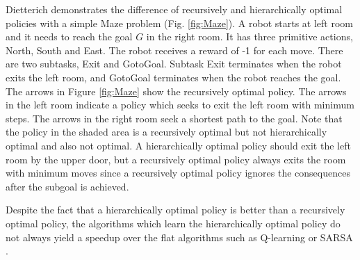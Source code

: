 Dietterich \cite{MaxQJ} demonstrates the difference of recursively and hierarchically optimal policies 
with a simple Maze problem (Fig. \ref{fig:Maze}). A robot starts at left room and it needs to reach 
the goal $G$ in the right room. It has three primitive actions, North, South and East.  
The robot receives a reward of -1 for each move.
There are two subtasks, Exit and GotoGoal. Subtask Exit terminates when the robot exits the left room,
and GotoGoal terminates when the robot reaches the goal. The arrows in Figure \ref{fig:Maze} show the 
recursively optimal policy. The arrows in the left room indicate a policy which seeks to exit
the left room with minimum steps. The arrows in the right room seek a shortest path to the goal.
Note that the policy in the shaded area is a recursively optimal but not hierarchically optimal and also not
optimal. A hierarchically optimal policy should exit the left room by the upper door, but a recursively 
optimal policy always exits the room with minimum moves since
a recursively optimal policy ignores the consequences after the subgoal is achieved. 

Despite the fact that a hierarchically optimal policy is better than a recursively optimal policy, 
the algorithms which learn the hierarchically optimal policy do not always yield a speedup over
the flat algorithms such as Q-learning or SARSA \cite{MaxQJ, Andre02}. 






